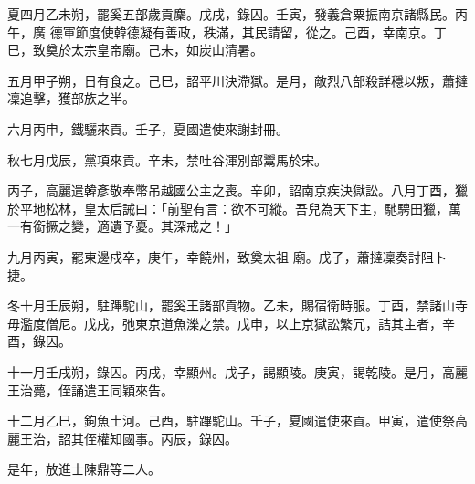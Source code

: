 \begin{pinyinscope}
 夏四月乙未朔，罷奚五部歲貢麇。戊戌，錄囚。壬寅，發義倉粟振南京諸縣民。丙午，廣
 德軍節度使韓德凝有善政，秩滿，其民請留，從之。己酉，幸南京。丁巳，致奠於太宗皇帝廟。己未，如炭山清暑。



 五月甲子朔，日有食之。己巳，詔平川決滯獄。是月，敵烈八部殺詳穩以叛，蕭撻凜追擊，獲部族之半。



 六月丙申，鐵驪來貢。壬子，夏國遣使來謝封冊。



 秋七月戊辰，黨項來貢。辛未，禁吐谷渾別部鬻馬於宋。



 丙子，高麗遣韓彥敬奉幣吊越國公主之喪。辛卯，詔南京疾決獄訟。八月丁酉，獵於平地松林，皇太后誡曰：「前聖有言：欲不可縱。吾兒為天下主，馳騁田獵，萬一有銜撅之變，適遺予憂。其深戒之！」



 九月丙寅，罷東邊戍卒，庚午，幸饒州，致奠太祖
 廟。戊子，蕭撻凜奏討阻卜捷。



 冬十月壬辰朔，駐蹕駝山，罷奚王諸部貢物。乙未，賜宿衛時服。丁酉，禁諸山寺毋濫度僧尼。戊戌，弛東京道魚濼之禁。戊申，以上京獄訟繁冗，詰其主者，辛酉，錄囚。



 十一月壬戌朔，錄囚。丙戌，幸顯州。戊子，謁顯陵。庚寅，謁乾陵。是月，高麗王治薨，侄誦遣王同穎來告。



 十二月乙巳，鉤魚土河。己酉，駐蹕駝山。壬子，夏國遣使來貢。甲寅，遣使祭高麗王治，詔其侄權知國事。丙辰，錄囚。



 是年，放進士陳鼎等二人。



\end{pinyinscope}